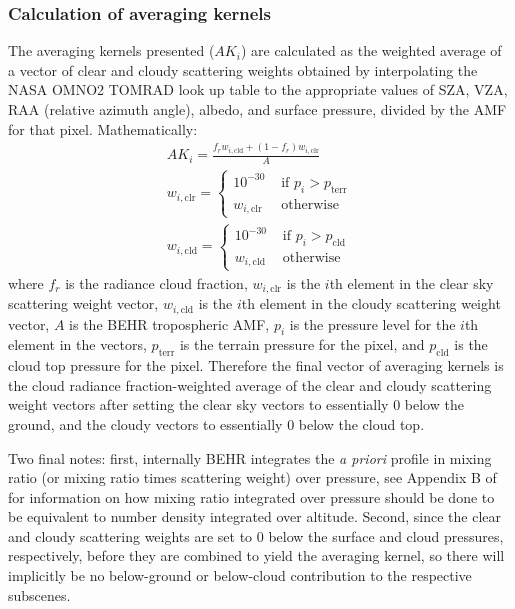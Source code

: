 \documentclass[12pt]{article}
\begin{document}
	\subsubsection{Calculation of averaging kernels}\label{sec:scattering-wt-calc}
	The averaging kernels presented ($AK_i$) are calculated as the weighted average of a vector of clear and cloudy scattering weights obtained by interpolating the NASA OMNO2 TOMRAD look up table to the appropriate values of SZA, VZA, RAA (relative azimuth angle), albedo, and surface pressure, divided by the AMF for that pixel. Mathematically:
	\begin{align}
		AK_i = \frac{f_r w_{i, \mathrm{cld}} + (1 - f_r) w_{i, \mathrm{clr}}}{A} \label{eqn-pubSW}\\
		w_{i, \mathrm{clr}} = \left\lbrace 
			\begin{matrix}
				10^{-30} & \text{ if } p_i > p_\mathrm{terr} \\
				w_{i, \mathrm{clr}} & \text{ otherwise }
			\end{matrix}\right. \\
		w_{i, \mathrm{cld}} = \left\lbrace 
			\begin{matrix} 
				10^{-30} & \text{ if } p_i > p_\mathrm{cld} \\
				w_{i, \mathrm{cld}} & \text{ otherwise }
			\end{matrix}\right. \label{eqn-cldSW}
	\end{align}
	where $f_r$ is the radiance cloud fraction, $w_{i, \mathrm{clr}}$ is the $i$th element in the clear sky scattering weight vector, $w_{i, \mathrm{cld}}$ is the $i$th element in the cloudy scattering weight vector, $A$ is the BEHR tropospheric AMF, $p_i$ is the pressure level for the $i$th element in the vectors, $p_\mathrm{terr}$ is the terrain pressure for the pixel, and $p_\mathrm{cld}$ is the cloud top pressure for the pixel. Therefore the final vector of averaging kernels is the cloud radiance fraction-weighted average of the clear and cloudy scattering weight vectors after setting the clear sky vectors to essentially 0 below the ground, and the cloudy vectors to essentially 0 below the cloud top.
	
	Two final notes: first, internally BEHR integrates the \emph{a priori} profile in mixing ratio (or mixing ratio times scattering weight) over pressure, see Appendix B of \citet{ziemka01} for information on how mixing ratio integrated over pressure should be done to be equivalent to number density integrated over altitude. Second, since the clear and cloudy scattering weights are set to 0 below the surface and cloud pressures, respectively, before they are combined to yield the averaging kernel, so there will implicitly be no below-ground or below-cloud contribution to the respective subscenes.
	


\end{document}
